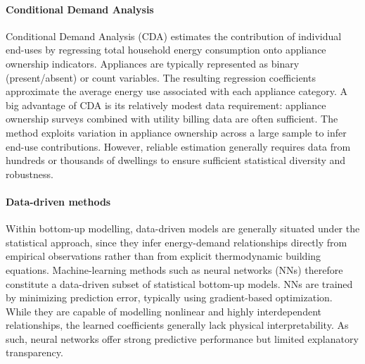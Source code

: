 \paragraph{Conditional Demand Analysis}
Conditional Demand Analysis (CDA) estimates the contribution of individual end-uses by regressing total household energy consumption onto appliance ownership indicators. Appliances are typically represented as binary (present/absent) or count variables. The resulting regression coefficients approximate the average energy use associated with each appliance category.
\newline A big advantage of CDA is its relatively modest data requirement: appliance ownership surveys combined with utility billing data are often sufficient. The method exploits variation in appliance ownership across a large sample to infer end-use contributions. However, reliable estimation generally requires data from hundreds or thousands of dwellings to ensure sufficient statistical diversity and robustness.

\paragraph{Data-driven methods}
Within bottom-up modelling, data-driven models are generally situated under the statistical approach, since they infer energy-demand relationships directly from empirical observations rather than from explicit thermodynamic building equations. Machine-learning methods such as neural networks (NNs) therefore constitute a data-driven subset of statistical bottom-up models. 
\newline NNs are trained by minimizing prediction error, typically using gradient-based optimization. While they are capable of modelling nonlinear and highly interdependent relationships, the learned coefficients generally lack physical interpretability. As such, neural networks offer strong predictive performance but limited explanatory transparency.


